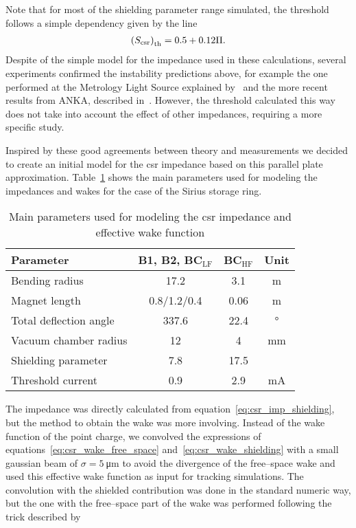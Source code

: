     Note that for most of the shielding parameter range simulated, the threshold follows a simple dependency given by the line
    \begin{align}\label{eq:csr_scaling_instability}
        \left(S_\text{csr}\right)_\text{th} = 0.5 + 0.12\Pi.
    \end{align}
    Despite of the simple model for the impedance used in these calculations, several experiments confirmed the instability predictions above, for example the one performed at the Metrology Light Source explained by~ and the more recent results from ANKA, described in~. However, the threshold calculated this way does not take into account the effect of other impedances, requiring a more specific study.

    Inspired by these good agreements between theory and measurements we decided to create an initial model for the \gls{csr} impedance based on this parallel plate approximation. Table~\ref{tab:csr_main_parameters} shows the main parameters used for modeling the impedances and wakes for the case of the Sirius storage ring.
    \begin{table}
        \centering
        \caption{Main parameters used for modeling the \gls{csr} impedance and effective wake function}
        \label{tab:csr_main_parameters}
        \begin{tabular}{lccc}
            \toprule
            Parameter              & B1, B2, BC$_\text{LF}$ & BC$_\text{HF}$ & Unit \\
            \midrule
            Bending radius         & 17.2             &  3.1  &\si{\meter}\\
            Magnet length          & 0.8/1.2/0.4      &  0.06 &\si{\meter}\\
            Total deflection angle & 337.6            &  22.4 &\si{\degree}\\
            Vacuum chamber radius  & 12               &  4    &\si{\milli\meter}\\
            Shielding parameter    & 7.8              &  17.5 & \\
            Threshold current      & 0.9              &  2.9  & \si{\milli\ampere}\\
            \bottomrule
        \end{tabular}
    \end{table}
    The impedance was directly calculated from equation~\eqref{eq:csr_imp_shielding}, but the method to obtain the wake was more involving. Instead of the wake function of the point charge, we convolved the expressions of equations~\eqref{eq:csr_wake_free_space} and~\eqref{eq:csr_wake_shielding} with a small gaussian beam of $\sigma = 5~$\si{\micro\meter} to avoid the divergence of the free--space wake and used this effective wake function as input for tracking simulations. The convolution with the shielded contribution was done in the standard numeric way, but the one with the free--space part of the wake was performed following the trick described by~
